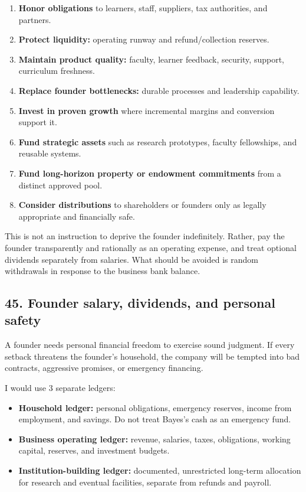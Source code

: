 \begin{enumerate}[leftmargin=*,itemsep=1.5pt]
  \item \textbf{Honor obligations} to learners, staff, suppliers, tax authorities, and partners.
  \item \textbf{Protect liquidity:} operating runway and refund/\allowbreak collection reserves.
  \item \textbf{Maintain product quality:} faculty, learner feedback, security, support, curriculum freshness.
  \item \textbf{Replace founder bottlenecks:} durable processes and leadership capability.
  \item \textbf{Invest in proven growth} where incremental margins and conversion support it.
  \item \textbf{Fund strategic assets} such as research prototypes, faculty fellowships, and reusable systems.
  \item \textbf{Fund long-horizon property or endowment commitments} from a distinct approved pool.
  \item \textbf{Consider distributions} to shareholders or founders only as legally appropriate and financially safe.
\end{enumerate}

This is not an instruction to deprive the founder indefinitely. Rather, pay the founder transparently and rationally as an operating expense, and treat optional dividends separately from salaries. What should be avoided is random withdrawals in response to the business bank balance.

\subsection{45. Founder salary, dividends, and personal safety}

A founder needs personal financial freedom to exercise sound judgment. If every setback threatens the founder's household, the company will be tempted into bad contracts, aggressive promises, or emergency financing.

I would use 3 separate ledgers:

\begin{itemize}[leftmargin=*,itemsep=1.5pt]
  \item \textbf{Household ledger:} personal obligations, emergency reserves, income from employment, and savings. Do not treat Bayes's cash as an emergency fund.
  \item \textbf{Business operating ledger:} revenue, salaries, taxes, obligations, working capital, reserves, and investment budgets.
  \item \textbf{Institution-building ledger:} documented, unrestricted long-term allocation for research and eventual facilities, separate from refunds and payroll.
\end{itemize}

